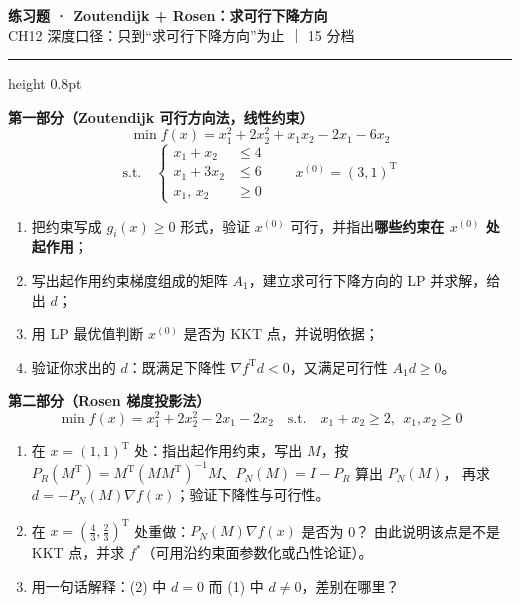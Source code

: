 \documentclass[11pt]{ctexart}
\begin{document}
\begin{center}
{\Large\bfseries 练习题 · Zoutendijk + Rosen：求可行下降方向}\\[4pt]
{\small\color{mygray}CH12 深度口径：只到``求可行下降方向''为止 ｜ 15 分档}
\end{center}
\vspace{-2pt}
\hrule height 0.8pt
\vspace{10pt}

\textbf{第一部分（Zoutendijk 可行方向法，线性约束）}
\[
\min f(x)=x_1^2+2x_2^2+x_1x_2-2x_1-6x_2
\]
\[
\text{s.t.}\quad
\left\{
\begin{aligned}
x_1+x_2 &\leq 4\\
x_1+3x_2 &\leq 6\\
x_1,\,x_2 &\geq 0
\end{aligned}
\right.
\qquad x^{(0)}=(3,1)^{\mathrm T}
\]

\begin{enumerate}
\item 把约束写成 $g_i(x)\geq 0$ 形式，验证 $x^{(0)}$ 可行，并指出\textbf{哪些约束在 $x^{(0)}$ 处起作用}；
\item 写出起作用约束梯度组成的矩阵 $A_1$，建立求可行下降方向的 LP 并求解，给出 $d$；
\item 用 LP 最优值判断 $x^{(0)}$ 是否为 KKT 点，并说明依据；
\item 验证你求出的 $d$：既满足下降性 $\nabla f^{\mathrm T}d<0$，又满足可行性 $A_1d\geq 0$。
\end{enumerate}

\vspace{8pt}
\textbf{第二部分（Rosen 梯度投影法）}
\[
\min f(x)=x_1^2+2x_2^2-2x_1-2x_2
\quad\text{s.t.}\quad x_1+x_2\geq 2,\ \ x_1,x_2\geq 0
\]

\begin{enumerate}
\item[(1)] 在 $x=(1,1)^{\mathrm T}$ 处：指出起作用约束，写出 $M$，按
$P_R(M^{\mathrm T})=M^{\mathrm T}(MM^{\mathrm T})^{-1}M$、$P_N(M)=I-P_R$ 算出 $P_N(M)$，
再求 $d=-P_N(M)\nabla f(x)$；验证下降性与可行性。
\item[(2)] 在 $x=\left(\tfrac43,\tfrac23\right)^{\mathrm T}$ 处重做：$P_N(M)\nabla f(x)$ 是否为 0？
由此说明该点是不是 KKT 点，并求 $f^{*}$（可用沿约束面参数化或凸性论证）。
\item[(3)] 用一句话解释：(2) 中 $d=0$ 而 (1) 中 $d\neq 0$，差别在哪里？
\end{enumerate}
\end{document}
